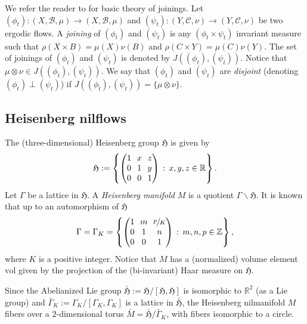 \documentclass[JEP,XML,SOM,Unicode,NoEqCountersInSection]{cedram}
\let\mathcal\mathscr
\newcommand{\vol}{\mathrm{vol}}
\newcommand{\sep}{\,:\,}
\theoremstyle{definition}
\theoremstyle{plain}
\newcommand\RR{\mathbb{R}}
\newcommand\ZZ{\mathbb{Z}}
\newcommand\cB{\mathcal{B}}
\newcommand\cC{\mathcal{C}}
\begin{document}
We refer the reader to \cite{Gla} for basic theory of joinings.
Let $(\phi_t):(X,\cB,\mu)\to (X,\cB,\mu)$ and $(\psi_t):(Y,\cC,\nu)\to (Y,\cC,\nu)$ be two ergodic flows. A \emph{joining} of $(\phi_t)$ and $(\psi_t)$ is any $(\phi_t\times \psi_t)$ invariant measure such that $\rho(X\times B)=\mu(X)\nu(B)$ and $\rho(C\times Y)=\mu(C)\nu(Y)$. The set of joinings of $(\phi_t)$ and $(\psi_t)$ is denoted by $J((\phi_t),(\psi_t))$. Notice that $\mu\otimes \nu \in J((\phi_t),(\psi_t))$. We say that $(\phi_t)$ and $(\psi_t)$ are \emph{disjoint} (denoting $(\phi_t)\perp (\psi_t)$) if $J((\phi_t),(\psi_t))=\{\mu\otimes \nu\}$.

\subsection{Heisenberg nilflows}
The (three-dimensional) Heisenberg group $\mathfrak H$ is given by
\[\arraycolsep3.5pt
\mathfrak H:=\left\{\begin{pmatrix}1&x&z\\0&1&y\\0&0&1\end{pmatrix}\sep x,y,z\in \RR\right\}.
\]
Let $\Gamma$ be a lattice in $\mathfrak H$. A \emph{Heisenberg manifold} $M$ is a quotient $\Gamma \backslash \mathfrak H$. It is known that up to an automorphism of
$\mathfrak H$
\[\arraycolsep3.5pt
\Gamma=\Gamma_K=\left\{\begin{pmatrix}1&m&\sfrac{p}{K}\\0&1&n\\0&0&1
\end{pmatrix}\sep m,n,p\in \ZZ\right\},
\]
where $K$ is a positive integer. Notice that $M$ has a (normalized) volume element $\vol$ given by the projection of the (bi-invariant) Haar
measure on $\mathfrak H$.

Since the Abelianized Lie group $\bar{\mathfrak H}:= \mathfrak H/[\mathfrak H,\mathfrak H]$ is isomorphic to $\RR^2$ (as a Lie group) and $\bar \Gamma_K := \Gamma_K/[\Gamma_K,\Gamma_K]$ is a lattice in
$\bar {\mathfrak H}$, the Heisenberg nilmanifold $M$ fibers over a $2$-dimensional torus $\bar M= \bar {\mathfrak H}/ \bar \Gamma_K$, with fibers isomorphic to a circle.
\end{document}
